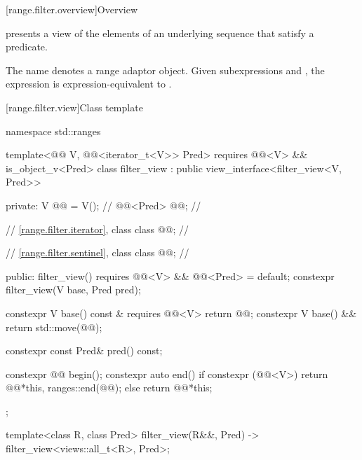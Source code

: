 [range.filter.overview]{Overview}

\pnum
{} presents a view of the elements
of an underlying sequence that satisfy a predicate.

\pnum
{}%
The name  denotes a
range adaptor object.
Given subexpressions  and ,
the expression  is expression-equivalent to
.

\pnum
\begin{example}
\end{example}

[range.filter.view]{Class template }

%
%
%
\begin{codeblock}
namespace std::ranges {
  template<@@ V, @@<iterator_t<V>> Pred>
    requires @@<V> && is_object_v<Pred>
  class filter_view : public view_interface<filter_view<V, Pred>> {
  private:
    V @@ = V();                              // \expos
    @@<Pred> @@;                    // \expos

    // \ref{range.filter.iterator}, class 
    class @@;                             // \expos

    // \ref{range.filter.sentinel}, class 
    class @@;                             // \expos

  public:
    filter_view() requires @@<V> && @@<Pred> = default;
    constexpr filter_view(V base, Pred pred);

    constexpr V base() const & requires @@<V> { return @@; }
    constexpr V base() && { return std::move(@@); }

    constexpr const Pred& pred() const;

    constexpr @@ begin();
    constexpr auto end() {
      if constexpr (@@<V>)
        return @@{*this, ranges::end(@@)};
      else
        return @@{*this};
    }
  };

  template<class R, class Pred>
    filter_view(R&&, Pred) -> filter_view<views::all_t<R>, Pred>;
}
\end{codeblock}

